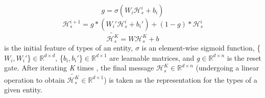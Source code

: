 \vspace{-0.2cm}
\begin{equation}
g = \sigma(W_{i}\mathcal{H}_{s}^{i} + b_{i})
\label{highway_agg_1}
\end{equation}
\vspace{-0.3cm}
\begin{equation}
\mathcal{H}_{s}^{i+1} = g\ast(W_{i}'\mathcal{H}_{s}^{i} + b_{i}') + (1-g)\ast\mathcal{H}_{s}^{i}
\label{highway_agg_2}
\end{equation}
\vspace{-0.2cm}
\begin{equation}
\widetilde{\mathcal{H}_{s}^{K}} = W\mathcal{H}_{s}^{K} + b
\label{highway_agg_3}
\end{equation}
 is the initial feature of types of  an entity, $\sigma$ is an element-wise sigmoid function, \{$W_{i}, W_{i}'$\}$\in\mathbb{R}^{d\times d}$, \{$b_{i}, b_{i}'$\}$\in\mathbb{R}^{d\times 1}$ are  learnable matrices, and \emph{g}$\in\mathbb{R}^{d\times n}$ is the reset gate. After iterating \emph{K} times , the final message $\mathcal{H}_{s}^{K}\in\mathbb{R}^{d\times n}$ (undergoing a linear operation to obtain $\widetilde{\mathcal{H}_{s}^{K}}\in\mathbb{R}^{d\times 1}$) is taken as the representation for the  types of a given entity. %
